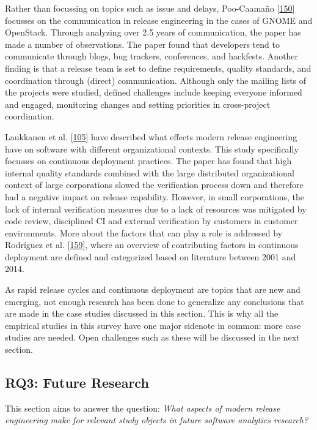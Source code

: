 \documentclass[]{book}
\begin{document}
Rather than focussing on topics such as issue and delays, Poo-Caamaño
{[}\protect\hyperlink{ref-poo-caamano2016a}{150}{]} focusses on the
communication in release engineering in the cases of GNOME and
OpenStack. Through analyzing over 2.5 years of communication, the paper
has made a number of observations. The paper found that developers tend
to communicate through blogs, bug trackers, conferences, and hackfests.
Another finding is that a release team is set to define requirements,
quality standards, and coordination through (direct) communication.
Although only the mailing lists of the projects were studied, defined
challenges include keeping everyone informed and engaged, monitoring
changes and setting priorities in cross-project coordination.

Laukkanen et al. {[}\protect\hyperlink{ref-laukkanen2018a}{105}{]} have
described what effects modern release engineering have on software with
different organizational contexts. This study specifically focusses on
continuous deployment practices. The paper has found that high internal
quality standards combined with the large distributed organizational
context of large corporations slowed the verification process down and
therefore had a negative impact on release capability. However, in small
corporations, the lack of internal verification measures due to a lack
of resources was mitigated by code review, disciplined CI and external
verification by customers in customer environments. More about the
factors that can play a role is addressed by Rodríguez et al.
{[}\protect\hyperlink{ref-rodriguez2017a}{159}{]}, where an overview of
contributing factors in continuous deployment are defined and
categorized based on literature between 2001 and 2014.

As rapid release cycles and continuous deployment are topics that are
new and emerging, not enough research has been done to generalize any
conclusions that are made in the case studies discussed in this section.
This is why all the empirical studies in this survey have one major
sidenote in common: more case studies are needed. Open challenges such
as these will be discussed in the next section.

\subsection{RQ3: Future Research}\label{rq3-future-research}

This section aims to answer the question: \emph{What aspects of modern
release engineering make for relevant study objects in future software
analytics research?}
\end{document}

